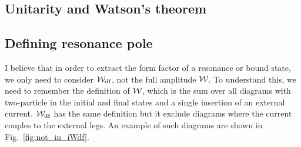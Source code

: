 %
%


  \subsection{Unitarity and Watson's theorem}
  


  \subsection{Defining resonance pole}
I believe that in order to extract the form factor of a resonance or bound state, we only need to consider ${\mathcal{W}}_{\rm df}$, not the full amplitude ${\mathcal{W}}$. To understand this, we need to remember the definition of ${\mathcal{W}}$, which is the sum over all diagrams with two-particle in the initial and final states and a single insertion of an external current. ${\mathcal{W}}_{\rm df}$ has the same definition but it exclude diagrams where the current couples to the external legs. An example of such diagrams are shown in Fig.~\ref{fig:not_in_iWdf}. 

